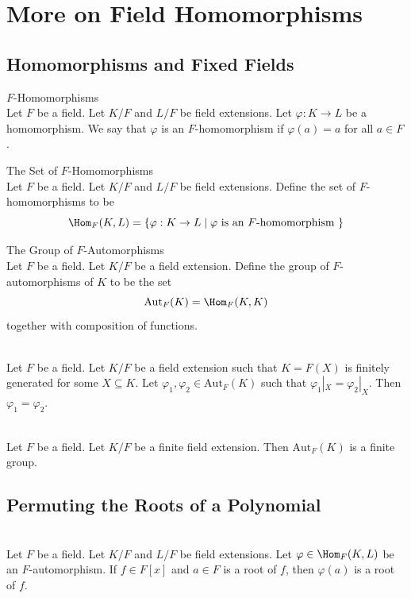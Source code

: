 \documentclass[a4paper]{article}
\begin{document}
\pagebreak
\section{More on Field Homomorphisms}
\subsection{Homomorphisms and Fixed Fields}
\begin{defn}{$F$-Homomorphisms}{}\\
Let $F$ be a field. Let $K/F$ and $L/F$ be field extensions. Let $\varphi:K\to L$ be a homomorphism. We say that $\varphi$ is an $F$-homomorphism if $\varphi(a)=a$ for all $a\in F$. 
\end{defn}

\begin{defn}{The Set of $F$-Homomorphisms}{}\\
Let $F$ be a field. Let $K/F$ and $L/F$ be field extensions. Define the set of $F$-homomorphisms to be $$\Hom_F(K,L)=\{\varphi:K\to L\;|\;\varphi\text{ is an }F\text{-homomorphism }\}$$
\end{defn}

\begin{defn}{The Group of $F$-Automorphisms}{}\\
Let $F$ be a field. Let $K/F$ be a field extension. Define the group of $F$-automorphisms of $K$ to be the set $$\text{Aut}_F(K)=\Hom_F(K,K)$$ together with composition of functions. 
\end{defn}

\begin{prp}{}{}\\
Let $F$ be a field. Let $K/F$ be a field extension such that $K=F(X)$ is finitely generated for some $X\subseteq K$. Let $\varphi_1,\varphi_2\in\text{Aut}_F(K)$ such that $\varphi_1|_X=\varphi_2|_X$. Then $\varphi_1=\varphi_2$. 
\end{prp}

\begin{lmm}{}{}\\
Let $F$ be a field. Let $K/F$ be a finite field extension. Then $\text{Aut}_F(K)$ is a finite group. 
\end{lmm}

\subsection{Permuting the Roots of a Polynomial}
\begin{prp}{}{}\\
Let $F$ be a field. Let $K/F$ and $L/F$ be field extensions. Let $\varphi\in\Hom_F(K,L)$ be an $F$-automorphism. If $f\in F[x]$ and $a\in F$ is a root of $f$, then $\varphi(a)$ is a root of $f$. 
\end{prp}
\end{document}
